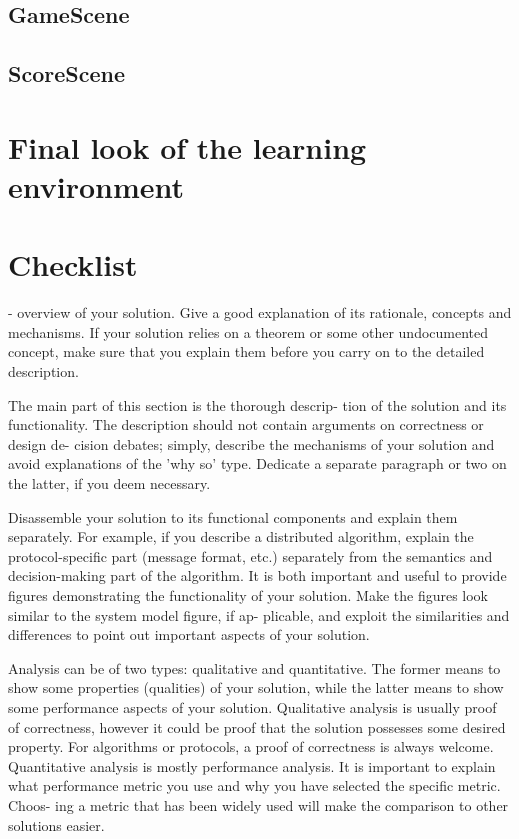 \subsection{GameScene}\label{subsec:gamescene}
\subsection{ScoreScene}\label{subsec:scorescene}


\section{Final look of the learning environment}\label{sec:final-look-of-the-learning-environment}


\section{Checklist}\label{sec:checklist}

- overview of your solution. Give a good explanation of its rationale,
concepts and mechanisms. If your solution relies on a
theorem or some other undocumented concept, make sure
that you explain them before you carry on to the detailed
description.

The main part of this section is the thorough descrip-
tion of the solution and its functionality.
The description should not contain arguments on correctness or design de-
cision debates; simply, describe the mechanisms of your
solution and avoid explanations of the 'why so' type.
Dedicate a separate paragraph or two on the latter, if
you deem necessary.

Disassemble your solution to its functional components
and explain them separately. For example, if you describe
a distributed algorithm, explain the protocol-specific part
(message format, etc.) separately from the semantics and
decision-making part of the algorithm.
It is both important and useful to provide figures
demonstrating the functionality of your solution. Make
the figures look similar to the system model figure, if ap-
plicable, and exploit the similarities and differences to
point out important aspects of your solution.

Analysis can be of two types: qualitative and quantitative.
The former means to show some properties (qualities)
of your solution, while the latter means to show some
performance aspects of your solution.
Qualitative analysis is usually proof of correctness,
however it could be proof that the solution possesses some
desired property. For algorithms or protocols, a proof of
correctness is always welcome.
Quantitative analysis is mostly performance analysis.
It is important to explain what performance metric you
use and why you have selected the specific metric. Choos-
ing a metric that has been widely used will make the
comparison to other solutions easier.
